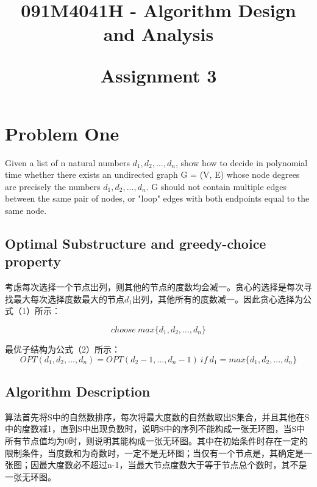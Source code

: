 \documentclass{article}
\begin{document}

\title{091M4041H - Algorithm Design and Analysis\\ [2ex] \begin{large} Assignment 3 \end{large}}


\maketitle

\tableofcontents

\newpage
\section{Problem One}
Given a list of n natural numbers $d_1, d_2,...,d_n$, show how to decide in polynomial time whether there exists an undirected graph G = (V, E) whose node degrees are precisely the numbers $d_1, d_2,..., d_n$. G should not contain multiple edges between the same pair of nodes, or "loop" edges with both endpoints equal to the same node.

\subsection{Optimal Substructure and greedy-choice property}
考虑每次选择一个节点出列，则其他的节点的度数均会减一。贪心的选择是每次寻找最大每次选择度数最大的节点$d_1$出列，其他所有的度数减一。因此贪心选择为公式（1）所示：

\begin{equation}
choose\ max\{d_1,d_2,...,d_n\} 
\end{equation} 

最优子结构为公式（2）所示：
\begin{equation}
OPT(d_1,d_2,...,d_n) = OPT(d_2-1,...,d_n-1)\ if\ d_1 = max\{d_1,d_2,...,d_n\}
\end{equation} 

\subsection{Algorithm Description}
算法首先将S中的自然数排序，每次将最大度数的自然数取出S集合，并且其他在S中的度数减1，直到S中出现负数时，说明S中的序列不能构成一张无环图，当S中所有节点值均为0时，则说明其能构成一张无环图。其中在初始条件时存在一定的限制条件，当度数和为奇数时，一定不是无环图；当仅有一个节点是，其确定是一张图；因最大度数必不超过n-1，当最大节点度数大于等于节点总个数时，其不是一张无环图。
\end{document}
